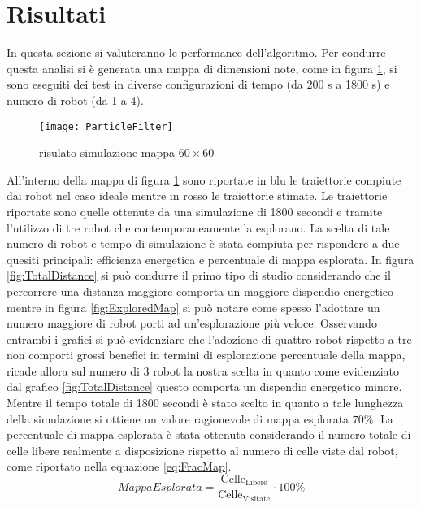 \section{Risultati}
\label{sec:risultati}
In questa sezione si valuteranno le performance dell'algoritmo.
Per condurre questa analisi si è generata una mappa di dimensioni note, come  in
figura \ref{fig:maptest}, si sono eseguiti dei test in diverse configurazioni
di tempo (da 200 \si{\second} a 1800 \si{\second}) e numero di robot
(da 1 a 4).
\begin{figure}[!htb]
	\centering
	\texttt{[image: ParticleFilter]}
	\caption{risulato simulazione mappa $60\times60$}
	\label{fig:maptest}
\end{figure}
All'interno della mappa di figura \ref{fig:maptest} sono riportate in blu le
traiettorie compiute dai robot nel caso ideale mentre in rosso le traiettorie
stimate.
Le traiettorie riportate sono quelle ottenute da una simulazione di 1800
secondi e tramite l'utilizzo di tre robot che contemporaneamente la esplorano.
La scelta di tale numero di robot e tempo di simulazione è stata compiuta per
rispondere a due quesiti principali: efficienza energetica e percentuale di
mappa esplorata.
In figura \ref{fig:TotalDistance} si può condurre il primo tipo di studio
considerando che il percorrere una distanza maggiore comporta un maggiore
dispendio energetico mentre in figura \ref{fig:ExploredMap} si può notare come
spesso l'adottare un numero maggiore di robot porti ad un'esplorazione più
veloce.
Osservando entrambi i grafici si può evidenziare che l'adozione di quattro robot
rispetto a tre non comporti grossi benefici in termini di esplorazione
percentuale della mappa, ricade allora sul numero di 3 robot la nostra scelta in
quanto come evidenziato dal grafico \ref{fig:TotalDistance} questo comporta un
dispendio energetico minore.
Mentre il tempo totale di 1800 secondi è stato scelto in quanto a tale lunghezza
della  simulazione si ottiene un valore ragionevole di mappa esplorata $70\%$.
La percentuale di mappa esplorata è stata ottenuta considerando il numero totale
di celle libere realmente a disposizione rispetto al numero di celle viste dal
robot, come riportato nella equazione \eqref{eq:FracMap}.
%
\begin{equation}
Mappa Esplorata = \frac{\text{Celle}_{\text{Libere}}}{\text{Celle}_{\text{Visitate}}} \cdot 100 \%
\label{eq:FracMap}
\end{equation}

